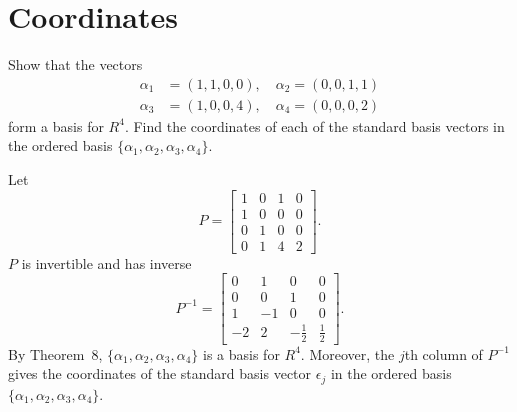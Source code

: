 \section{Coordinates}

 Show that the vectors
\begin{align*}
  \alpha_1 &= (1, 1, 0, 0), \quad \alpha_2 = (0, 0, 1, 1) \\
  \alpha_3 &= (1, 0, 0, 4), \quad \alpha_4 = (0, 0, 0, 2)
\end{align*}
form a basis for $R^4$. Find the coordinates of each of the standard
basis vectors in the ordered basis
$\{\alpha_1, \alpha_2, \alpha_3, \alpha_4\}$.
\begin{solution}
  Let
  \begin{equation*}
    P =
    \begin{bmatrix}
      1 & 0 & 1 & 0 \\
      1 & 0 & 0 & 0 \\
      0 & 1 & 0 & 0 \\
      0 & 1 & 4 & 2
    \end{bmatrix}.
  \end{equation*}
  $P$ is invertible and has inverse
  \begin{equation*}
    P^{-1} =
    \begin{bmatrix}
      0 & 1 & 0 & 0 \\
      0 & 0 & 1 & 0 \\
      1 & -1 & 0 & 0 \\
      -2 & 2 & -\frac12 & \frac12
    \end{bmatrix}.
  \end{equation*}
  By Theorem~8, $\{\alpha_1, \alpha_2, \alpha_3, \alpha_4\}$ is a
  basis for $R^4$. Moreover, the $j$th column of $P^{-1}$ gives the
  coordinates of the standard basis vector $\epsilon_j$ in the ordered
  basis $\{\alpha_1, \alpha_2, \alpha_3, \alpha_4\}$.
\end{solution}

